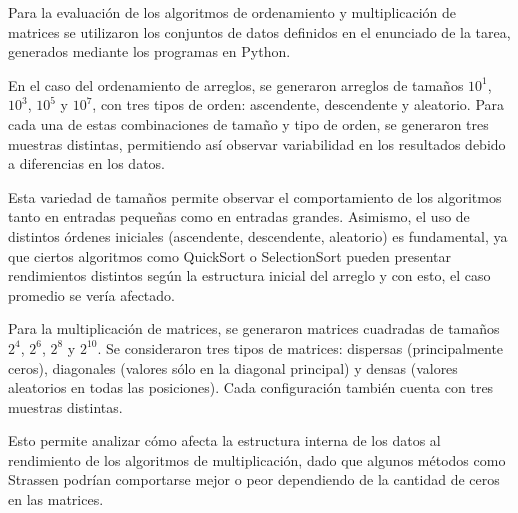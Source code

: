 Para la evaluación de los algoritmos de ordenamiento y multiplicación de matrices se utilizaron los conjuntos de datos definidos en el enunciado de la tarea, generados mediante los programas en Python.

En el caso del ordenamiento de arreglos, se generaron arreglos de tamaños $10^1$, $10^3$, $10^5$ y $10^7$, con tres tipos de orden: ascendente, descendente y aleatorio. Para cada una de estas combinaciones de tamaño y tipo de orden, se generaron tres muestras distintas, permitiendo así observar variabilidad en los resultados debido a diferencias en los datos.

Esta variedad de tamaños permite observar el comportamiento de los algoritmos tanto en entradas pequeñas como en entradas grandes. Asimismo, el uso de distintos órdenes iniciales (ascendente, descendente, aleatorio) es fundamental, ya que ciertos algoritmos como QuickSort o SelectionSort pueden presentar rendimientos distintos según la estructura inicial del arreglo y con esto, el caso promedio se vería afectado.

Para la multiplicación de matrices, se generaron matrices cuadradas de tamaños $2^4$, $2^6$, $2^8$ y $2^{10}$. Se consideraron tres tipos de matrices: dispersas (principalmente ceros), diagonales (valores sólo en la diagonal principal) y densas (valores aleatorios en todas las posiciones). Cada configuración también cuenta con tres muestras distintas.

Esto permite analizar cómo afecta la estructura interna de los datos al rendimiento de los algoritmos de multiplicación, dado que algunos métodos como Strassen podrían comportarse mejor o peor dependiendo de la cantidad de ceros en las matrices.

